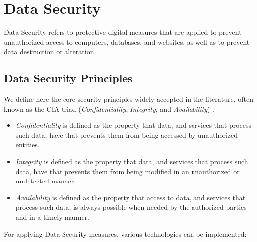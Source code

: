 
\section{Data Security} 
\label{sec:DataSecurity}


Data Security refers to protective digital measures that are applied to prevent unauthorized access to computers, databases, and websites, as well as to prevent data destruction or alteration.


\subsection{Data Security Principles}
\label{ssec:DataProtectionGoals}


We define here the core security principles widely accepted in the literature, often known as the CIA triad (\textit{Confidentiality}, \textit{Integrity}, and \textit{Availability}) \cite{Hansen2015}.

\begin{itemize}

    \item \textit{Confidentiality} is defined as the property that data, and services that process such data, have that prevents them from being accessed by unauthorized entities.

    \item \textit{Integrity} is defined as the property that data, and services that process such data, have that prevents them from being modified in an unauthorized or undetected manner.

    \item \textit{Availability} is defined as the property that access to data, and services that process such data, is always possible when needed by the authorized parties and in a timely manner.

\end{itemize}


For applying Data Security measures, various technologies can be implemented:

